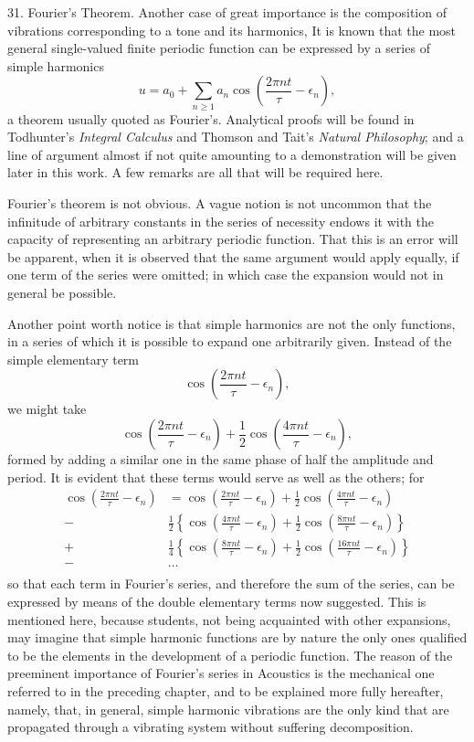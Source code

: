 31.  Fourier's Theorem. Another case of great importance is the composition of
vibrations corresponding to a tone and its harmonics, It is known that the most
general single-valued finite periodic function can be expressed by a series of
simple harmonics
\[ u=a_0+\sum_{n \geq 1} a_n \cos \left(\frac{2 \pi n t}{\tau}-\epsilon_n\right) \tag{1},\]
a theorem usually quoted as Fourier's.
Analytical proofs will be found in Todhunter's \textit{Integral Calculus} and
Thomson and Tait's \textit{Natural Philosophy}; and a line of argument almost
if not quite amounting to a demonstration will be given later in this work. A
few remarks are all that will be required here.

Fourier's theorem is not obvious. A vague notion is not uncommon that the
infinitude of arbitrary constants in the series of necessity endows it with the
capacity of representing an arbitrary periodic function.  That this is an error
will be apparent, when it is observed that the same argument would apply
equally, if one term of the series were omitted; in which case the expansion
would not in general be possible.

Another point worth notice is that simple harmonics are not the only functions,
in a series of which it is possible to expand one arbitrarily given. Instead of
the simple elementary term
\[\cos \left(\frac{2 \pi n t}{\tau}-\epsilon_n\right),\]
we might take
\[
\cos \left(\frac{2 \pi n t}{\tau}-\epsilon_n\right)+
\frac{1}{2} \cos \left(\frac{4 \pi n t}{\tau}-\epsilon_n\right),
\]
formed by adding a similar one in the same phase
of half the amplitude and period. It is evident that these terms would serve as
well as the others; for
\begin{align*}
\cos \left(\frac{2 \pi n t}{\tau}-\epsilon_n\right) &
= \cos \left(\frac{2 \pi n t}{\tau}-\epsilon_n\right)+
  \frac{1}{2} \cos \left(\frac{4 \pi n t}{\tau}-\epsilon_n\right) \\
- & \frac{1}{2}\left\{
       \cos \left(\frac{4\pi nt}{\tau}-\epsilon_n\right)+
  \frac{1}{2} \cos \left(\frac{8\pi nt}{\tau}-\epsilon_n\right)
        \right\} \\
+ & \frac{1}{4}\left\{\cos \left(\frac{8\pi nt}{\tau}-\epsilon_n\right)+
     \frac{1}{2} \cos \left(\frac{16\pi nt}{\tau}-\epsilon_n\right)\right\} \\
- & \ldots \\
\end{align*}
so that each term in Fourier's series,
and therefore the sum of the series, can be expressed by means of the double
elementary terms now suggested. This is mentioned here, because students, not
being acquainted with other expansions, may imagine that simple harmonic
functions are by nature the only ones qualified to be the elements in the
development of a periodic function. The reason of the preeminent importance of
Fourier's series in Acoustics is the mechanical one referred to in the
preceding chapter, and to be explained more fully hereafter, namely, that, in
general, simple harmonic vibrations are the only kind that are propagated
through a vibrating system without suffering decomposition.

